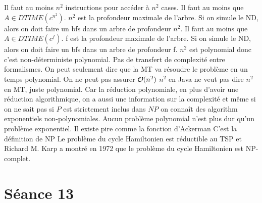 \begin{mcqs}
  {Il faut au moins $n^2$ instructions pour accéder à $n^2$ cases.}
  {Il faut au moins que $A \in DTIME(c^{n^2})$. $n^2$ est la profondeur maximale de l'arbre. Si on simule le ND, alors on doit faire un bfs dans un arbre de profondeur $n^2$.}
  {Il faut au moins que $A \in DTIME(c^f)$. f est la profondeur maximale de l'arbre. Si on simule le ND, alors on doit faire un bfs dans un arbre de profondeur f.}
  {$n^2$ est polynomial donc c'est non-déterministe polynomial.}
  {Pas de transfert de complexité entre formalismes. On peut seulement dire que la MT va résoudre le problème en un temps polynomial. On ne peut pas assurer $\bigO(n^{2})$}
  {$n^2$ en Java ne veut pas dire $n^2$ en MT, juste polynomial.}
  {Car la réduction polynomiale, en plus d’avoir une réduction algorithmique, on a aussi une information sur la complexité
  et même si on ne sait pas si $P$ est strictement inclus dans $NP$ on connaît des algorithm exponentiels non-polynomiales.}
  {Aucun problème polynomial n'est plus dur qu'un problème exponentiel.}
  {Il existe pire comme la fonction d'Ackerman}
  {C'est la définition de NP}
  {Le problème du cycle Hamiltonien est réductible au TSP et Richard M. Karp a montré en 1972 que le problème du cycle Hamiltonien est NP-complet.}
\end{mcqs}

\section*{Séance 13}


